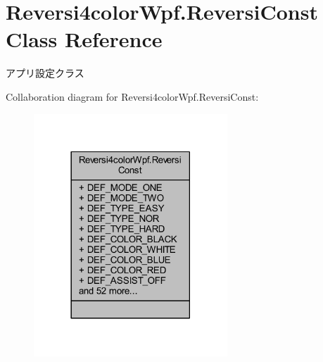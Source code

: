 \hypertarget{class_reversi4color_wpf_1_1_reversi_const}{}\section{Reversi4color\+Wpf.\+Reversi\+Const Class Reference}
\label{class_reversi4color_wpf_1_1_reversi_const}


アプリ設定クラス  




Collaboration diagram for Reversi4color\+Wpf.\+Reversi\+Const\+:
\nopagebreak
\begin{figure}[H]
\begin{center}
\leavevmode
\includegraphics[width=206pt]{class_reversi4color_wpf_1_1_reversi_const__coll__graph}
\end{center}
\end{figure}
